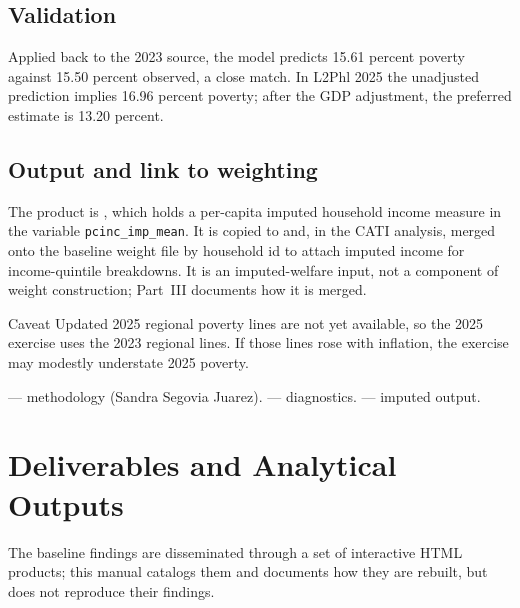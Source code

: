 \subsection{Validation}

Applied back to the 2023 source, the model predicts 15.61 percent
poverty against 15.50 percent observed, a close match. In L2Phl 2025 the
unadjusted prediction implies 16.96 percent poverty; after the GDP
adjustment, the preferred estimate is 13.20 percent.

\subsection{Output and link to weighting}

\begin{sloppypar}
The product is , which holds a
per-capita imputed household income measure in the variable
\texttt{pcinc\_imp\_mean}. It is copied to
 and, in the CATI
analysis, merged onto the baseline weight file by household id to attach
imputed income for income-quintile breakdowns. It is an imputed-welfare
input, not a component of weight construction; Part~III documents how it
is merged.
\end{sloppypar}

\begin{notebox}{Caveat}
Updated 2025 regional poverty lines are not yet available, so the 2025
exercise uses the 2023 regional lines. If those lines rose with
inflation, the exercise may modestly understate 2025 poverty.
\end{notebox}

\begin{refbox}
\begin{sloppypar}
 --- methodology (Sandra Segovia Juarez).
 --- diagnostics.
 --- imputed output.
\end{sloppypar}
\end{refbox}

\section{Deliverables and Analytical Outputs}

The baseline findings are disseminated through a set of interactive HTML
products; this manual catalogs them and documents how they are rebuilt,
but does not reproduce their findings.

